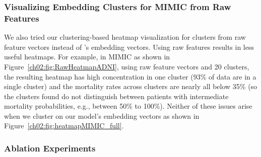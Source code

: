 \subsubsection{Visualizing Embedding Clusters for MIMIC from Raw Features}
\label{ch02:sec:heatmap_mimic_raw}
We also tried our clustering-based heatmap visualization for clusters from raw feature vectors instead of ’s embedding vectors.
Using raw features results in less useful heatmaps.
For example, in MIMIC as shown in Figure~\ref{ch02:fig:RawHeatmapADNI}, using raw feature vectors and 20 clusters, the resulting heatmap has high concentration in one cluster (93\% of data are in a single cluster) and the mortality rates across clusters are nearly all below 35\% (so the clusters found do not distinguish between patients with intermediate mortality probabilities, e.g., between 50\% to 100\%).
Neither of these issues arise when we cluster on our model’s embedding vectors as shown in Figure~\ref{ch02:fig:heatmapMIMIC_full}.



\subsubsection{Ablation Experiments}
\label{ch02:sec:ablation}

